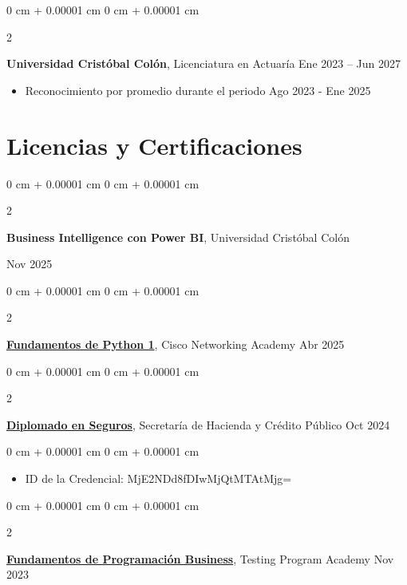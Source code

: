 \documentclass[10pt, letterpaper]{article}
\newenvironment{highlights}{
    \begin{itemize}[
        topsep=0.10 cm,
        parsep=0.10 cm,
        partopsep=0pt,
        itemsep=0pt,
        leftmargin=0 cm + 10pt
    ]
}{
    \end{itemize}
} %
\newenvironment{onecolentry}{
    \begin{adjustwidth}{
        0 cm + 0.00001 cm
    }{
        0 cm + 0.00001 cm
    }
}{
    \end{adjustwidth}
} %
\newenvironment{twocolentry}[2][]{
    \onecolentry
    \def\secondColumn{#2}
    \setcolumnwidth{\fill, 4.5 cm}
    \begin{paracol}{2}
}{
    \switchcolumn \raggedleft \secondColumn
    \end{paracol}
    \endonecolentry
} %
\begin{document}
        \begin{twocolentry}{
            Ene 2023 – Jun 2027
        }
            \textbf{Universidad Cristóbal Colón}, Licenciatura en Actuaría\end{twocolentry}
                \begin{highlights}
                    \item Reconocimiento por promedio durante el periodo Ago 2023 - Ene 2025
                \end{highlights}    
        \vspace{0.10 cm}

 \section{Licencias y Certificaciones}
		
		\begin{twocolentry}{
			Nov 2025
			}
			\textbf{Business Intelligence con Power BI}, Universidad Cristóbal Colón
		\end{twocolentry}  
		\vspace{0.10cm}	
		
        \begin{twocolentry}{
            Abr 2025
        }
            \href{https://www.credly.com/badges/bcacb0c9-c50e-44ce-a68c-ddd050b1626e/public_url}{\textbf{Fundamentos de Python 1}}, Cisco Networking Academy \end{twocolentry}

        \vspace{0.10 cm}
        
        \begin{twocolentry}{
            Oct 2024
        }
            \href{https://diplomadoenseguros.condusef.gob.mx/qr_verifica.php?ida=21647&idg=3}{\textbf{Diplomado en Seguros}}, Secretaría de Hacienda y Crédito Público\end{twocolentry}

        \vspace{0.10 cm}
        \begin{onecolentry}
            \begin{highlights}
                \item ID de la Credencial: MjE2NDd8fDIwMjQtMTAtMjg=
            \end{highlights}
        \end{onecolentry}

        \begin{twocolentry}{
            Nov 2023
        }
            \href{https://testingprogram.com.mx/validar/}{\textbf{Fundamentos de Programación Business}}, Testing Program Academy\end{twocolentry}
\end{document}
